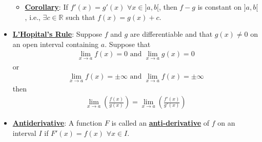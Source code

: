 \documentclass[11pt]{article}
\newcommand{\dfn}[1]{\underline{\textbf{#1}}}
\newcommand{\R}[0]{\mathbb{R}}
\begin{document}
\begin{itemize}[noitemsep]
	\begin{itemize}[noitemsep]
		\item \dfn{Corollary}: If $f'(x) = g'(x)$ $\forall x \in ]a,b[$, then $f-g$ is constant on $]a,b[$, i.e., $\exists c \in \R$ such that $f(x) = g(x) +c$. 
	\end{itemize}
	\item \dfn{L'Hopital's Rule}: Suppose $f$ and $g$ are differentiable and that $g(x) \neq 0$ on an open interval containing $a$. Suppose that
	\begin{align}
		\lim_{x \rightarrow a} f(x) = 0 \text{ and } \lim_{x \rightarrow a} g(x) = 0 	
	\end{align}
	or
	\begin{align}
		\lim_{x \rightarrow a} f(x) = \pm \infty \text{ and } \lim_{x \rightarrow a} f(x)  = \pm \infty 	
	\end{align}
	then
	\begin{align}
		\lim_{x \rightarrow a} \left( \frac{f(x)}{g(x)} \right) = \lim_{ x \rightarrow a} \left( \frac{f'(x)}{g'(x)}	\right) 
	\end{align}
	\item \dfn{Antiderivative}: A function $F$ is called an \dfn{anti-derivative} of $f$ on an interval $I$ if $F'(x) = f(x)$ $\forall x \in I$. 
\end{itemize}
\end{document}
